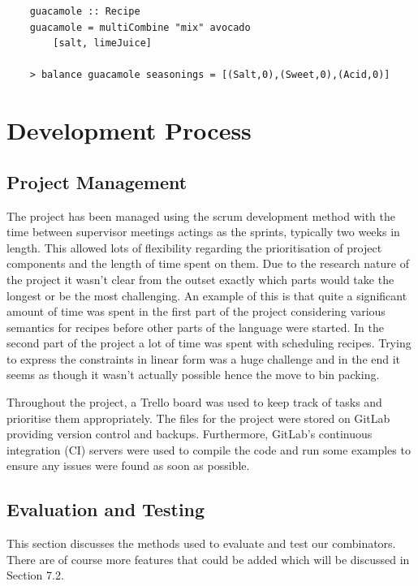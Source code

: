 \documentclass[11pt]{article}
\begin{document}
\begin{lstlisting}
    guacamole :: Recipe
    guacamole = multiCombine "mix" avocado
        [salt, limeJuice]

    > balance guacamole seasonings = [(Salt,0),(Sweet,0),(Acid,0)]
\end{lstlisting}

\section{Development Process}

\subsection{Project Management}

The project has been managed using the scrum development method with the time
between supervisor meetings actings as the sprints, typically two weeks in length.
This allowed lots of flexibility regarding the prioritisation of project
components and the length of time spent on them. Due to the research nature
of the project it wasn't clear from the outset exactly which parts would take the
longest or be the most challenging. An example of this is that
quite a significant amount of time was spent in the first part of the project
considering various semantics for recipes before other parts of the language
were started. In the second part of the project a lot of time was spent
with scheduling recipes. Trying to express the constraints in linear form
was a huge challenge and in the end it seems as though it wasn't actually possible
hence the move to bin packing.

\medbreak

Throughout the project, a Trello board was used to keep track of tasks
and prioritise them appropriately. The files for the project were stored
on GitLab providing version control and backups. Furthermore, GitLab's
continuous integration (CI) servers were used to compile the code and run
some examples to ensure any issues were found as soon as possible.

\subsection{Evaluation and Testing}

This section discusses the methods used to evaluate and test our
combinators. There are of course more features that could be
added which will be discussed in Section 7.2.
\end{document}
